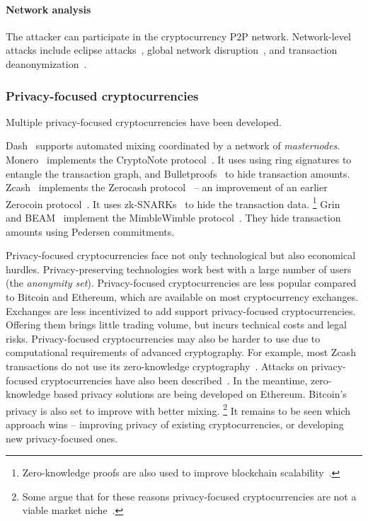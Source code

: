 \paragraph{Network analysis}
The attacker can participate in the cryptocurrency P2P network.
Network-level attacks include eclipse attacks~\cite{Marcus2018, Henningsen2019}, global network disruption~\cite{Apostolaki2017}, and transaction deanonymization~\cite{Biryukov2014}.


\subsubsection*{Privacy-focused cryptocurrencies}

Multiple privacy-focused cryptocurrencies have been developed.

Dash~\cite{Dash} supports automated mixing coordinated by a network of \textit{masternodes}.
Monero~\cite{Monero} implements the CryptoNote protocol~\cite{Saberhagen2013}.
It uses using ring signatures to entangle the transaction graph, and Bulletproofs~\cite{Buenz2018} to hide transaction amounts.
Zcash~\cite{Zcash} implements the Zerocash protocol~\cite{BenSasson2014, Hopwood2020} -- an improvement of an earlier Zerocoin protocol~\cite{Miers2013}.
It uses zk-SNARKs~\cite{BenSasson2014a} to hide the transaction data.
\footnote{Zero-knowledge proofs are also used to improve blockchain scalability~\cite{Bonneau2020}.}
Grin~\cite{Grin} and BEAM~\cite{Beam} implement the MimbleWimble protocol~\cite{Jedusor2016}.
They hide transaction amounts using Pedersen commitments.

Privacy-focused cryptocurrencies face not only technological but also economical hurdles.
Privacy-preserving technologies work best with a large number of users (the \textit{anonymity set}).
Privacy-focused cryptocurrencies are less popular compared to Bitcoin and Ethereum, which are available on most cryptocurrency exchanges.
Exchanges are less incentivized to add support privacy-focused cryptocurrencies.
Offering them brings little trading volume, but incurs technical costs and legal risks.
Privacy-focused cryptocurrencies may also be harder to use due to computational requirements of advanced cryptography.
For example, most Zcash transactions do not use its zero-knowledge cryptography~\cite{Quesnelle2017, Biryukov2019c}.
Attacks on privacy-focused cryptocurrencies have also been described~\cite{Moeser2018, Biryukov2019e, Tramer2020}.
In the meantime, zero-knowledge based privacy solutions are being developed on Ethereum.
Bitcoin's privacy is also set to improve with better mixing.
\footnote{Some argue that for these reasons privacy-focused cryptocurrencies are not a viable market niche~\cite{Gentry2019}.}
It remains to be seen which approach wins -- improving privacy of existing cryptocurrencies, or developing new privacy-focused ones.



